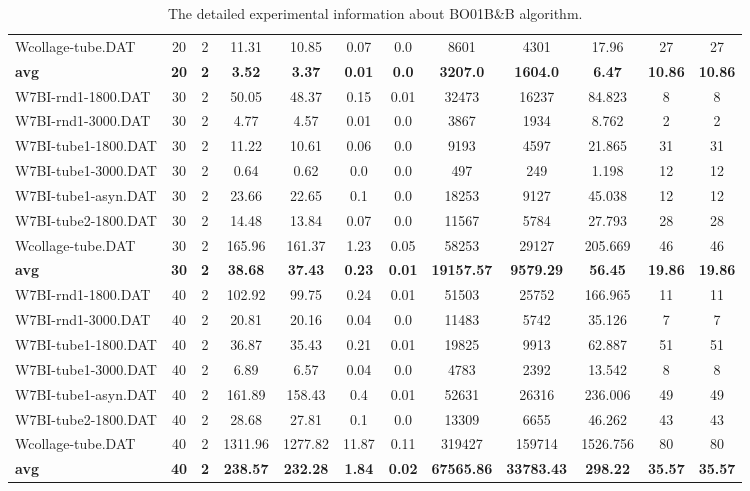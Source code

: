 \begin{table}[!h]
{\begin{tabular}{lccccccccccc}
Wcollage-tube.DAT & 20 & 2 & 11.31 & 10.85 & 0.07 & 0.0 & 8601 & 4301 & 17.96 & 27 & 27\\
\cline{1-12} \textbf{avg} & \textbf{20} & \textbf{2} & \textbf{3.52} & \textbf{3.37} & \textbf{0.01} & \textbf{0.0} & \textbf{3207.0} & \textbf{1604.0} & \textbf{6.47} & \textbf{10.86} & \textbf{10.86} \\ \cline{1-12}
W7BI-rnd1-1800.DAT & 30 & 2 & 50.05 & 48.37 & 0.15 & 0.01 & 32473 & 16237 & 84.823 & 8 & 8\\
W7BI-rnd1-3000.DAT & 30 & 2 & 4.77 & 4.57 & 0.01 & 0.0 & 3867 & 1934 & 8.762 & 2 & 2\\
W7BI-tube1-1800.DAT & 30 & 2 & 11.22 & 10.61 & 0.06 & 0.0 & 9193 & 4597 & 21.865 & 31 & 31\\
W7BI-tube1-3000.DAT & 30 & 2 & 0.64 & 0.62 & 0.0 & 0.0 & 497 & 249 & 1.198 & 12 & 12\\
W7BI-tube1-asyn.DAT & 30 & 2 & 23.66 & 22.65 & 0.1 & 0.0 & 18253 & 9127 & 45.038 & 12 & 12\\
W7BI-tube2-1800.DAT & 30 & 2 & 14.48 & 13.84 & 0.07 & 0.0 & 11567 & 5784 & 27.793 & 28 & 28\\
Wcollage-tube.DAT & 30 & 2 & 165.96 & 161.37 & 1.23 & 0.05 & 58253 & 29127 & 205.669 & 46 & 46\\
\cline{1-12} \textbf{avg} & \textbf{30} & \textbf{2} & \textbf{38.68} & \textbf{37.43} & \textbf{0.23} & \textbf{0.01} & \textbf{19157.57} & \textbf{9579.29} & \textbf{56.45} & \textbf{19.86} & \textbf{19.86} \\ \cline{1-12}
W7BI-rnd1-1800.DAT & 40 & 2 & 102.92 & 99.75 & 0.24 & 0.01 & 51503 & 25752 & 166.965 & 11 & 11\\
W7BI-rnd1-3000.DAT & 40 & 2 & 20.81 & 20.16 & 0.04 & 0.0 & 11483 & 5742 & 35.126 & 7 & 7\\
W7BI-tube1-1800.DAT & 40 & 2 & 36.87 & 35.43 & 0.21 & 0.01 & 19825 & 9913 & 62.887 & 51 & 51\\
W7BI-tube1-3000.DAT & 40 & 2 & 6.89 & 6.57 & 0.04 & 0.0 & 4783 & 2392 & 13.542 & 8 & 8\\
W7BI-tube1-asyn.DAT & 40 & 2 & 161.89 & 158.43 & 0.4 & 0.01 & 52631 & 26316 & 236.006 & 49 & 49\\
W7BI-tube2-1800.DAT & 40 & 2 & 28.68 & 27.81 & 0.1 & 0.0 & 13309 & 6655 & 46.262 & 43 & 43\\
Wcollage-tube.DAT & 40 & 2 & 1311.96 & 1277.82 & 11.87 & 0.11 & 319427 & 159714 & 1526.756 & 80 & 80\\
\cline{1-12} \textbf{avg} & \textbf{40} & \textbf{2} & \textbf{238.57} & \textbf{232.28} & \textbf{1.84} & \textbf{0.02} & \textbf{67565.86} & \textbf{33783.43} & \textbf{298.22} & \textbf{35.57} & \textbf{35.57} \\ \cline{1-12}
\bottomrule
\end{tabular}%
}%
\caption{The detailed experimental information about BO01B\&B algorithm.}
\label{tab:table_bb}
\end{table}

